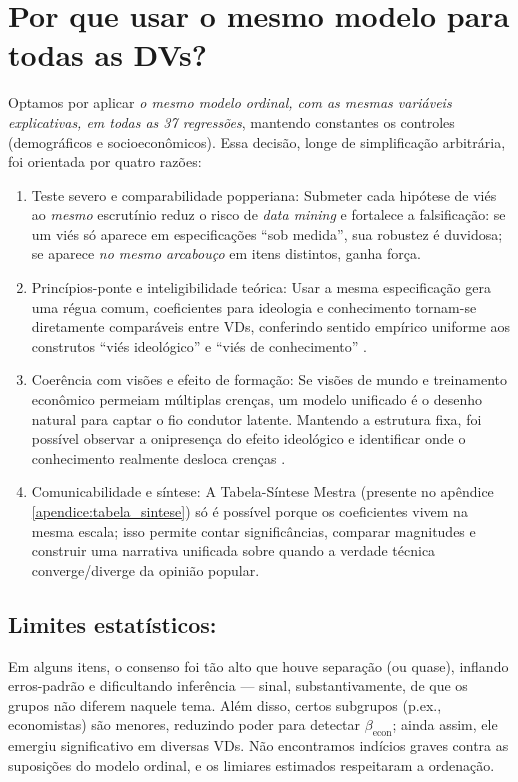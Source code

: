 \section{Por que usar o mesmo modelo para todas as DVs?} 

Optamos por aplicar \emph{o mesmo modelo ordinal, com as mesmas variáveis explicativas, em todas as 37 regressões}, mantendo constantes os controles (demográficos e socioeconômicos). Essa decisão, longe de simplificação arbitrária, foi orientada por quatro razões:

\begin{enumerate}[label=\roman*)]
    \item Teste severo e comparabilidade popperiana: Submeter cada hipótese de viés ao \emph{mesmo} escrutínio reduz o risco de \emph{data mining} e fortalece a falsificação: se um viés só aparece em especificações “sob medida”, sua robustez é duvidosa; se aparece \emph{no mesmo arcabouço} em itens distintos, ganha força.
    \item Princípios-ponte e inteligibilidade teórica: Usar a mesma especificação gera uma régua comum, coeficientes para ideologia e conhecimento tornam-se diretamente comparáveis entre VDs, conferindo sentido empírico uniforme aos construtos “viés ideológico” e “viés de conhecimento” \cite{stigum2003econometrics}.
    \item Coerência com visões e efeito de formação: Se visões de mundo e treinamento econômico permeiam múltiplas crenças, um modelo unificado é o desenho natural para captar o fio condutor latente. Mantendo a estrutura fixa, foi possível observar a onipresença do efeito ideológico e identificar onde o conhecimento realmente desloca crenças \cite{sowell2007conflict,newman2020ideia}.
    \item Comunicabilidade e síntese: A Tabela-Síntese Mestra (presente no apêndice \ref{apendice:tabela_sintese}) só é possível porque os coeficientes vivem na mesma escala; isso permite contar significâncias, comparar magnitudes e construir uma narrativa unificada sobre quando a verdade técnica converge/diverge da opinião popular.
\end{enumerate}

\subsection{Limites estatísticos:} Em alguns itens, o consenso foi tão alto que houve separação (ou quase), inflando erros-padrão e dificultando inferência — sinal, substantivamente, de que os grupos não diferem naquele tema. Além disso, certos subgrupos (p.ex., economistas) são menores, reduzindo poder para detectar $\beta_{\text{econ}}$; ainda assim, ele emergiu significativo em diversas VDs. Não encontramos indícios graves contra as suposições do modelo ordinal, e os limiares estimados respeitaram a ordenação.


